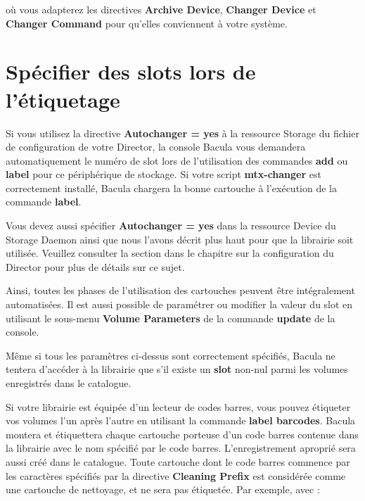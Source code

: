 o\`u vous adapterez les directives {\bf Archive Device}, {\bf Changer Device} et
{\bf Changer Command} pour qu'elles conviennent \`a votre syst\`eme.

\label{SpecifyingSlots}
\section{Sp\'ecifier des slots lors de l'\'etiquetage}

Si vous utilisez la directive  {\bf Autochanger = yes} \`a la ressource Storage 
du fichier de configuration de votre Director, la console Bacula vous 
demandera automatiquement le num\'ero de slot lors de l'utilisation des 
commandes {\bf add} ou {\bf label} pour ce p\'eriph\'erique de stockage. Si 
votre script {\bf mtx-changer} est correctement install\'e, Bacula 
chargera la bonne cartouche \`a l'ex\'ecution de la commande {\bf label}.

Vous devez aussi sp\'ecifier {\bf Autochanger = yes} dans la ressource 
Device du Storage Daemon ainsi que nous l'avons d\'ecrit plus haut pour 
que la librairie soit utilis\'ee. Veuillez consulter la section 
 dans le chapitre sur la configuration 
du Director pour plus de d\'etails sur ce sujet.
  
Ainsi, toutes les phases de l'utilisation des cartouches peuvent \^etre 
int\'egralement automatis\'ees. Il est aussi possible de param\'etrer ou 
modifier la valeur du slot en utilisant le sous-menu {\bf Volume Parameters} 
de la commande {\bf update} de la console.

M\^eme si tous les param\`etres ci-dessus sont correctement sp\'ecifi\'es, Bacula ne 
tentera d'acc\'eder \`a la librairie que s'il existe un {\bf slot} non-nul parmi 
les volumes enregistr\'es dans le catalogue.

Si votre librairie est \'equip\'ee d'un lecteur de codes barres, vous pouvez 
\'etiqueter vos volumes l'un apr\`es l'autre en utilisant la commande 
{\bf label barcodes}. Bacula montera et \'etiquettera chaque cartouche porteuse 
d'un code barres contenue dans la librairie avec le nom sp\'ecifi\'e par le 
code barres. L'enregistrement apropri\'e sera aussi cr\'e\'e dans le catalogue. 
Toute cartouche dont le code barres commence par les caract\`eres sp\'ecifi\'es par 
la directive {\bf Cleaning Prefix} est consid\'er\'ee comme une cartouche de 
nettoyage, et ne sera pas \'etiquet\'ee. Par exemple, avec :

